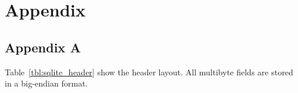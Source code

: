 %
%
%
%
%
%

\section{Appendix}
\label{sec:appendix}

\subsection{Appendix A}
\label{subsec:append_a}

Table~\ref{tbl:sqlite_header} show the header layout.  All multibyte fields are stored in a big-endian format.

